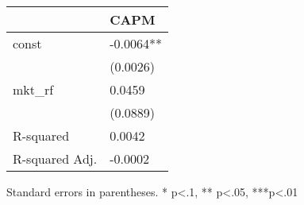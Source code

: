 \begin{table}
\caption{}
\label{}
\begin{center}
\begin{tabular}{ll}
\hline
               & CAPM       \\
\hline
const          & -0.0064**  \\
               & (0.0026)   \\
mkt\_rf        & 0.0459     \\
               & (0.0889)   \\
R-squared      & 0.0042     \\
R-squared Adj. & -0.0002    \\
\hline
\end{tabular}
\end{center}
\end{table}
\bigskip
Standard errors in parentheses. \newline 
* p<.1, ** p<.05, ***p<.01